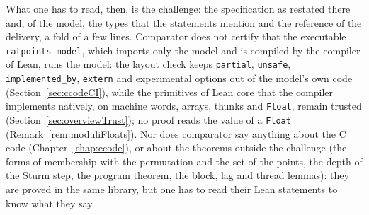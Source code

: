 What one has to read, then, is the challenge: the specification as restated there and, of the model,
the types that the statements mention and the reference of the delivery, a fold of a few lines.
Comparator does not certify that the executable \verb|ratpoints-model|, which imports only the model
and is compiled by the compiler of Lean, runs the model: the layout check keeps \verb|partial|,
\verb|unsafe|, \verb|implemented_by|, \verb|extern| and experimental options out of the model's own
code (Section~\ref{sec:ccodeCI}), while the primitives of Lean core that the compiler implements
natively, on machine words, arrays, thunks and \verb|Float|, remain trusted
(Section~\ref{sec:overviewTrust}); no proof reads the value of a \verb|Float|
(Remark~\ref{rem:moduliFloats}). Nor does comparator say anything about the C code
(Chapter~\ref{chap:ccode}), or about the theorems outside the challenge (the forms of membership
with the permutation and the set of the points, the depth of the Sturm step, the program theorem,
the block, lag and thread lemmas): they are proved in the same library, but one has to read their
Lean statements to know what they say.
